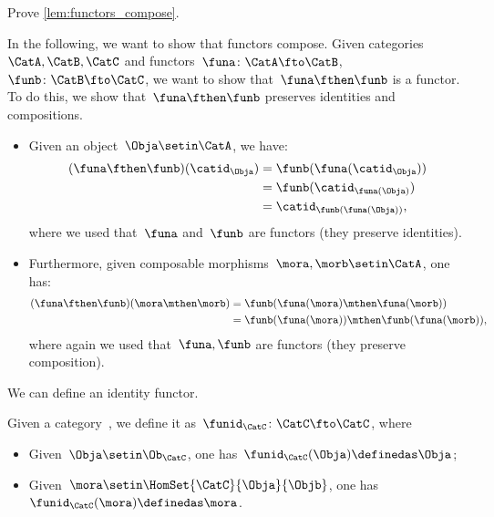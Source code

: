 \begin{exercise}
    Prove \cref{lem:functors_compose}.
\end{exercise}
\begin{solution}
    In the following, we want to show that functors compose.
    Given categories~$\CatA,\CatB,\CatC$ and functors~$\funa\colon \CatA\fto \CatB$,~$\funb \colon \CatB\fto \CatC$, we want to show that~$\funa\fthen\funb$ is a functor.
    To do this, we show that~$\funa\fthen\funb$ preserves identities and compositions.
    \begin{itemize}
        \item Given an object~$\Obja\setin \CatA$, we have:
              \begin{equation*}
                  \begin{aligned}
                      (\funa\fthen\funb)(\catid_\Obja)
                       & =\funb(\funa(\catid_\Obja)) \\
                       & =\funb(\catid_{\funa(\Obja)}) \\
                       & =\catid_{\funb(\funa(\Obja))},
                  \end{aligned}
              \end{equation*}
              where we used that~$\funa$ and~$\funb$ are functors (they preserve identities).
        \item Furthermore, given composable morphisms~$\mora,\morb\setin \CatA$, one has:
              \begin{equation*}
                  \begin{aligned}
                      (\funa\fthen\funb)(\mora\mthen\morb)
                       & =\funb(\funa(\mora)\mthen \funa(\morb)) \\
                       & =\funb(\funa(\mora))\mthen \funb(\funa(\morb)),
                  \end{aligned}
              \end{equation*}
              where again we used that~$\funa,\funb$ are functors (they preserve composition).
    \end{itemize}
\end{solution}

We can define an identity functor.

\begin{ctdefinition}
    \label{def:identity_functor}
    Given a category~\CatC, we define it as~$\funid_\CatC\colon \CatC \fto \CatC$, where
    \begin{itemize}
        \item Given~$\Obja\setin \Ob_\CatC$, one has~$\funid_\CatC(\Obja)\definedas \Obja$;
        \item Given~$\mora \setin \HomSet{\CatC}{\Obja}{\Objb}$, one has~$\funid_\CatC(\mora)\definedas \mora$.
    \end{itemize}
\end{ctdefinition}

